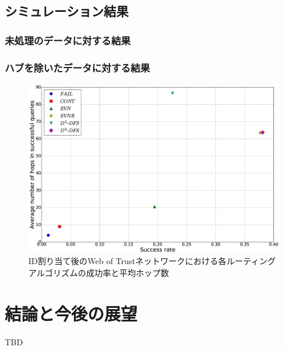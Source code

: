 \documentclass[dvipdfmx]{ampbt}
\begin{document}
  \subsection{シミュレーション結果}
   \subsubsection{未処理のデータに対する結果}
   \subsubsection{ハブを除いたデータに対する結果}
\begin{figure}[htbp]
  \centerline{\includegraphics[width=120mm]{../fig/succ_hops_full.eps}}
  \caption{ID割り当て後のWeb of Trustネットワークにおける各ルーティングアルゴリズムの成功率と平均ホップ数}
  \label{fig:succ_hops_full}
\end{figure}

\section{結論と今後の展望}
TBD
\acknowledgment

\clearpage
{} %





\clearpage
\appendix
\end{document}
